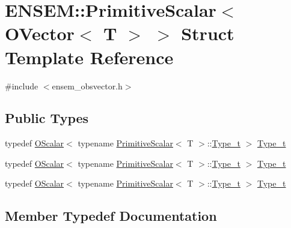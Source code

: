 \hypertarget{structENSEM_1_1PrimitiveScalar_3_01OVector_3_01T_01_4_01_4}{}\section{E\+N\+S\+EM\+:\+:Primitive\+Scalar$<$ O\+Vector$<$ T $>$ $>$ Struct Template Reference}
\label{structENSEM_1_1PrimitiveScalar_3_01OVector_3_01T_01_4_01_4}


{\ttfamily \#include $<$ensem\+\_\+obsvector.\+h$>$}

\subsection*{Public Types}
\begin{DoxyCompactItemize}
\item 
typedef \mbox{\hyperlink{classENSEM_1_1OScalar}{O\+Scalar}}$<$ typename \mbox{\hyperlink{structENSEM_1_1PrimitiveScalar}{Primitive\+Scalar}}$<$ T $>$\+::\mbox{\hyperlink{structENSEM_1_1PrimitiveScalar_3_01OVector_3_01T_01_4_01_4_adf4731d74a76b08e5cc003ad658050b0}{Type\+\_\+t}} $>$ \mbox{\hyperlink{structENSEM_1_1PrimitiveScalar_3_01OVector_3_01T_01_4_01_4_adf4731d74a76b08e5cc003ad658050b0}{Type\+\_\+t}}
\item 
typedef \mbox{\hyperlink{classENSEM_1_1OScalar}{O\+Scalar}}$<$ typename \mbox{\hyperlink{structENSEM_1_1PrimitiveScalar}{Primitive\+Scalar}}$<$ T $>$\+::\mbox{\hyperlink{structENSEM_1_1PrimitiveScalar_3_01OVector_3_01T_01_4_01_4_adf4731d74a76b08e5cc003ad658050b0}{Type\+\_\+t}} $>$ \mbox{\hyperlink{structENSEM_1_1PrimitiveScalar_3_01OVector_3_01T_01_4_01_4_adf4731d74a76b08e5cc003ad658050b0}{Type\+\_\+t}}
\item 
typedef \mbox{\hyperlink{classENSEM_1_1OScalar}{O\+Scalar}}$<$ typename \mbox{\hyperlink{structENSEM_1_1PrimitiveScalar}{Primitive\+Scalar}}$<$ T $>$\+::\mbox{\hyperlink{structENSEM_1_1PrimitiveScalar_3_01OVector_3_01T_01_4_01_4_adf4731d74a76b08e5cc003ad658050b0}{Type\+\_\+t}} $>$ \mbox{\hyperlink{structENSEM_1_1PrimitiveScalar_3_01OVector_3_01T_01_4_01_4_adf4731d74a76b08e5cc003ad658050b0}{Type\+\_\+t}}
\end{DoxyCompactItemize}


\subsection{Member Typedef Documentation}
\mbox{\label{structENSEM_1_1PrimitiveScalar_3_01OVector_3_01T_01_4_01_4_adf4731d74a76b08e5cc003ad658050b0}} 
